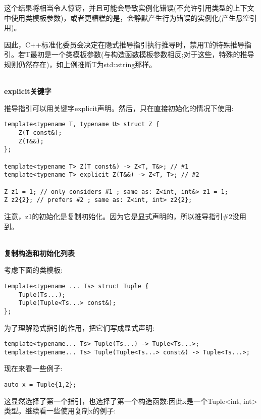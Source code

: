这个结果将相当令人惊讶，并且可能会导致实例化错误(不允许引用类型的上下文中使用类模板参数)，或者更糟糕的是，会静默产生行为错误的实例化(产生悬空引用)。

因此，C++标准化委员会决定在隐式推导指引执行推导时，禁用T的特殊推导指引。若T最初是一个类模板参数(与构造函数模板参数相反;对于这些，特殊的推导规则仍然存在)，如上例推断T为std::string那样。

\hspace*{\fill} \\ %
\noindent
\textbf{explicit关键字}

推导指引可以用关键字explicit声明。然后，只在直接初始化的情况下使用:

\begin{lstlisting}[style=styleCXX]
template<typename T, typename U> struct Z {
	Z(T const&);
	Z(T&&);
};

template<typename T> Z(T const&) -> Z<T, T&>; // #1
template<typename T> explicit Z(T&&) -> Z<T, T>; // #2

Z z1 = 1; // only considers #1 ; same as: Z<int, int&> z1 = 1;
Z z2{2}; // prefers #2 ; same as: Z<int, int> z2{2};
\end{lstlisting}

注意，z1的初始化是复制初始化。因为它是显式声明的，所以推导指引\#2没用到。

\hspace*{\fill} \\ %
\noindent
\textbf{复制构造和初始化列表}

考虑下面的类模板:

\begin{lstlisting}[style=styleCXX]
template<typename ... Ts> struct Tuple {
	Tuple(Ts...);
	Tuple(Tuple<Ts...> const&);
};
\end{lstlisting}

为了理解隐式指引的作用，把它们写成显式声明:

\begin{lstlisting}[style=styleCXX]
template<typename... Ts> Tuple(Ts...) -> Tuple<Ts...>;
template<typename... Ts> Tuple(Tuple<Ts...> const&) -> Tuple<Ts...>;
\end{lstlisting}

现在来看一些例子:

\begin{lstlisting}[style=styleCXX]
auto x = Tuple{1,2};
\end{lstlisting}

这显然选择了第一个指引，也选择了第一个构造函数:因此x是一个Tuple<int, int>类型。继续看一些使用复制x的例子:

